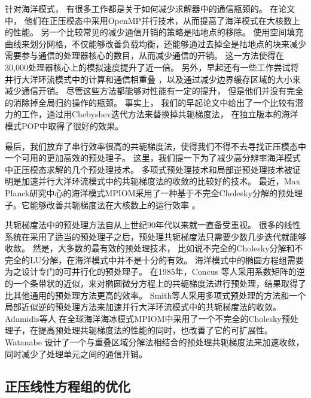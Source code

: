 针对海洋模式， 有很多工作都是关于如何减少求解器中的通信瓶颈的。 
在论文\cite{Worley:2011:PCE:2063384.2063457}中， 他们在正压模态中采用OpenMP并行技术，从而提高了海洋模式在大核数上的性能。 
另一个比较常见的减少通信开销的策略是陆地点的移除\cite{dennis2007inverse,dennis2008scaling}。 
使用空间填充曲线来划分网格，不仅能够改善负载均衡，还能够通过去掉全是陆地点的块来减少需要参与通信的处理器核心的数目，从而减少通信的开销。 
这一方法使得在30,000处理器核心上的模拟速度提升了近一倍。 
另外，早起还有一些工作尝试将并行大洋环流模式中的计算和通信相重叠 \cite{beare1997optimisation}，以及通过减少边界缓存区域的大小来减少通信开销。 
尽管这些方法都能够对性能有一定的提升， 但是他们并没有完全的消除掉全局归约操作的瓶颈。 
事实上， 我们的早起论文中给出了一个比较有潜力的工作，通过用Chebyshev迭代方法来替换掉共轭梯度法，
在独立版本的海洋模式POP中取得了很好的效果。 

 
最后，我们放弃了串行效率很高的共轭梯度法，使得我们不得不去寻找正压模态中一个可用的更加高效的预处理子。 
这里，我们提一下为了减少高分辨率海洋模式中正压模态求解的几个预处理技术。 
多项式预处理技术和局部逆预处理技术被证明是加速并行大洋环流模式中的共轭梯度法的收敛的比较好的技术\cite{smith1992parallel}。 
最近，Max Planck研究中心的海洋模式MPIOM采用了一种基于不完全Cholesky分解的预处理子。它能够改善共轭梯度法在大核数上的运行效率 \cite{adamidis2011high}。


  
共轭梯度法中的预处理方法自从上世纪90年代以来就一直备受重视。 
很多的线性系统在采用了适当的预处理子之后，预处理共轭梯度法只需要少数几步迭代就能够收敛。 
然是，大多数的最有效的预处理技术， 比如说不完全的Cholesky分解和不完全的LU分解，在海洋模式中并不是十分的有效。 
海洋模式中的椭圆方程组需要为之设计专门的可并行化的预处理子。 
在1985年，Concus 等人\cite{concus1985block}采用系数矩阵的逆的一个条带状的近似，来对椭圆微分方程上的共轭梯度法进行预处理，结果取得了比其他通用的预处理方法更高的效率。 
Smith等人\cite{smith1992parallel}采用多项式预处理的方法和一个局部近似逆的预处理方法来加速并行大洋环流模式中的共轭梯度法的收敛。 
Adamidis等人 \cite{adamidis2011high} 在全球海洋海冰模式MPIOM中采用了一个不完全的Cholesky预处理子，在提高预处理共轭梯度法的性能的同时，也改善了它的可扩展性。 
Watanabe \cite{Watanabe2006pcg} 设计了一个与重叠区域分解法相结合的预处理共轭梯度法来加速收敛，同时减少了处理单元之间的通信开销。 



\subsection{正压线性方程组的优化}
\label{related:improve}

